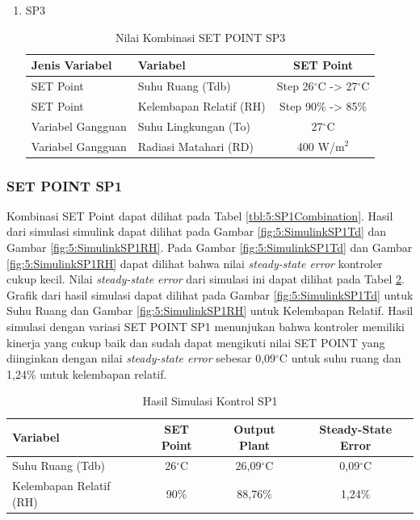 \begin{enumerate}
	\item SP3
	\begin{table}[!h]
		\caption{Nilai Kombinasi SET POINT SP3}
		\label{tbl:5:SP3Combination}
		\centering
		\begin{tabular}{|l|l|c|}
			\hline
			\textbf{Jenis Variabel} & \textbf{Variabel} & \textbf{SET Point} \\ \hline
			SET Point & Suhu Ruang (Tdb) & Step 26$^\circ$C -> 27$^\circ$C \\ \hline
			SET Point & Kelembapan Relatif (RH) & Step 90\% -> 85\% \\ \hline
			Variabel Gangguan & Suhu Lingkungan (To) & 27$^\circ$C           \\ \hline
			Variabel Gangguan & Radiasi Matahari (RD) & 400 W/m$^2$    \\ \hline
		\end{tabular}
	\end{table}
\end{enumerate}

\subsubsection{SET POINT SP1}

Kombinasi SET Point dapat dilihat pada Tabel \ref{tbl:5:SP1Combination}. Hasil dari simulasi simulink dapat dilihat pada Gambar \ref{fig:5:SimulinkSP1Td} dan Gambar \ref{fig:5:SimulinkSP1RH}. Pada Gambar \ref{fig:5:SimulinkSP1Td} dan Gambar \ref{fig:5:SimulinkSP1RH} dapat dilihat bahwa nilai \textit{steady-state error} kontroler cukup kecil. Nilai \textit{steady-state error} dari simulasi ini dapat dilihat pada Tabel \ref{tbl:5:SP1Ess}. Grafik dari hasil simulasi dapat dilihat pada Gambar \ref{fig:5:SimulinkSP1Td} untuk Suhu Ruang dan Gambar \ref{fig:5:SimulinkSP1RH} untuk Kelembapan Relatif. Hasil simulasi dengan variasi SET POINT SP1 menunjukan bahwa kontroler memiliki kinerja yang cukup baik dan sudah dapat mengikuti nilai SET POINT yang diinginkan dengan nilai \textit{steady-state error} sebesar 0,09$^\circ$C untuk suhu ruang dan 1,24\% untuk kelembapan relatif. \\

\begin{table}[!h]
	\caption{Hasil Simulasi Kontrol SP1}
	\label{tbl:5:SP1Ess}
	\centering
	\begin{tabular}{|l|c|c|c|}
		\hline
		\textbf{Variabel} & \textbf{SET Point} & \textbf{Output Plant} & \textbf{Steady-State Error}\\ \hline
		Suhu Ruang (Tdb) & 26$^\circ$C & 26,09$^\circ$C & 0,09$^\circ$C \\ \hline
		Kelembapan Relatif (RH) & 90\% & 88,76\% & 1,24\% \\ \hline
	\end{tabular}
\end{table}

